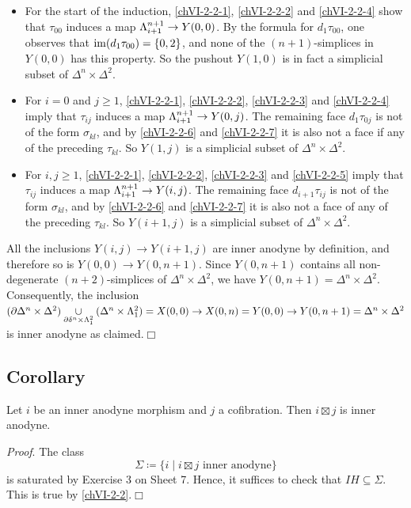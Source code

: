         \begin{itemize}
            \item 
                For the start of the induction, \ref{chVI-2-2-1}, \ref{chVI-2-2-2} and \ref{chVI-2-2-4} show that $\tau_{0 0}$ induces a map $\Lambda^{n+1}_{i+1} \to Y(0, 0)$. By the formula for $d_1 \tau_{0 0}$, one observes that $\operatorname{im}(d_1 \tau_{0 0}) = \{0, 2\}$, and none of the $(n+1)$-simplices in $Y(0, 0)$ has this property. So the pushout $Y(1, 0)$ is in fact a simplicial subset of $\Delta^n \times \Delta^2$.
            \item 
                For $i = 0$ and $j \geq 1$, \ref{chVI-2-2-1}, \ref{chVI-2-2-2}, \ref{chVI-2-2-3} and \ref{chVI-2-2-4} imply that $\tau_{i j}$ induces a map $\Lambda^{n+1}_{i+1} \to Y(0, j)$. The remaining face $d_1 \tau_{0 j}$ is not of the form $\sigma_{k l}$, and by \ref{chVI-2-2-6} and \ref{chVI-2-2-7} it is also not a face if any of the preceding $\tau_{k l}$. So $Y(1, j)$ is a simplicial subset of $\Delta^n \times \Delta^2$.
            \item 
                For $i, j \geq 1$, \ref{chVI-2-2-1}, \ref{chVI-2-2-2}, \ref{chVI-2-2-3} and \ref{chVI-2-2-5} imply that $\tau_{i j}$ induces a map $\Lambda^{n+1}_{i+1} \to Y(i, j)$. The remaining face $d_{i+1} \tau_{i j}$ is not of the form $\sigma_{k l}$, and by \ref{chVI-2-2-6} and \ref{chVI-2-2-7} it is also not a face of any of the preceding $\tau_{k l}$. So $Y(i + 1, j)$ is a simplicial subset of $\Delta^n \times \Delta^2$.
        \end{itemize}
        All the inclusions $Y(i, j) \to Y(i + 1, j)$ are inner anodyne by definition, and therefore so is $Y(0, 0) \to Y(0, n + 1)$. Since $Y(0, n + 1)$ contains all non-degenerate $(n + 2)$-simplices of $\Delta^n \times \Delta^2$, we have $Y(0, n + 1) = \Delta^n \times \Delta^2$. Consequently, the inclusion $(\partial \Delta^n \times \Delta^2) \underset{\partial \delta^n \times \Lambda^{2}_{1}}{\cup} (\Delta^n \times \Lambda^{2}_{1}) = X(0, 0) \to X(0, n) = Y(0, 0) \to Y(0, n + 1) = \Delta^n \times \Delta^2$ is inner anodyne as claimed.\hfill$\Box$

    \subsection{Corollary}\label{chVI-2-3}
        Let $i$ be an inner anodyne morphism and $j$ a cofibration. Then $i \boxtimes j$ is inner anodyne.
        \smallskip

        \emph{Proof}. The class
        \begin{equation*}
            \Sigma \coloneq \{ i \mid i \boxtimes j \text{ inner anodyne} \}
        \end{equation*}
        is saturated by Exercise 3 on Sheet 7. Hence, it suffices to check that $I H \subseteq \Sigma$. This is true by \ref{chVI-2-2}.\hfill$\Box$

